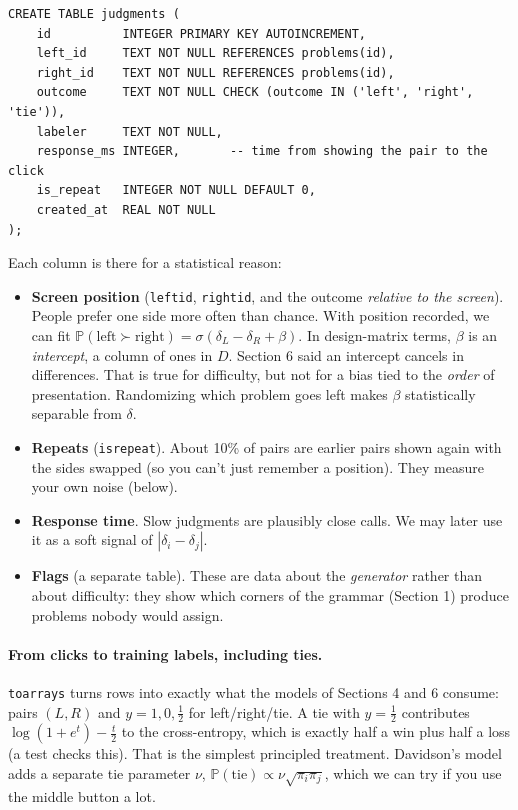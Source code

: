 \documentclass[11pt]{article}
\theoremstyle{definition}
\theoremstyle{plain}
\theoremstyle{remark}
\renewcommand{\P}{\mathbb{P}}
\newcommand{\code}[1]{\texttt{#1}}
\renewcommand{\_}{\oldunderscore\allowbreak}
\newcommand{\file}[1]{\textcolor{blue!50!black}{\texttt{#1}}}
\newcommand{\codefrom}[1]{\par\smallskip\noindent{\footnotesize\textbf{From} \file{#1}}}
\begin{document}
\codefrom{src/calcdiff/labels/store.py}
\begin{lstlisting}
CREATE TABLE judgments (
    id          INTEGER PRIMARY KEY AUTOINCREMENT,
    left_id     TEXT NOT NULL REFERENCES problems(id),
    right_id    TEXT NOT NULL REFERENCES problems(id),
    outcome     TEXT NOT NULL CHECK (outcome IN ('left', 'right', 'tie')),
    labeler     TEXT NOT NULL,
    response_ms INTEGER,       -- time from showing the pair to the click
    is_repeat   INTEGER NOT NULL DEFAULT 0,
    created_at  REAL NOT NULL
);
\end{lstlisting}
Each column is there for a statistical reason:
\begin{itemize}[nosep]
\item \textbf{Screen position} (\code{left\_id}, \code{right\_id}, and the outcome \emph{relative to the screen}). People prefer one side more
  often than chance. With position recorded, we can fit $\P(\text{left}\succ\text{right})=\sigma(\delta_L-\delta_R+\beta)$. In design-matrix terms,
  $\beta$ is an \emph{intercept}, a column of ones in $D$. Section 6 said an intercept cancels in differences. That is true for
  difficulty, but not for a bias tied to the \emph{order} of presentation. Randomizing which problem goes left makes $\beta$
  statistically separable from $\delta$.
\item \textbf{Repeats} (\code{is\_repeat}). About 10\% of pairs are earlier pairs shown again with the sides swapped (so you can't
  just remember a position). They measure your own noise (below).
\item \textbf{Response time}. Slow judgments are plausibly close calls. We may later use it as a soft signal of $|\delta_i-\delta_j|$.
\item \textbf{Flags} (a separate table). These are data about the \emph{generator} rather than about difficulty: they show which corners of the grammar
  (Section 1) produce problems nobody would assign.
\end{itemize}

\paragraph{From clicks to training labels, including ties.}
\code{to\_arrays} turns rows into exactly what the models of Sections 4 and 6 consume: pairs $(L,R)$ and $y=1,0,\frac12$ for
left/right/tie. A tie with $y=\frac12$ contributes $\log(1+e^{t})-\frac t2$ to the cross-entropy, which is exactly half a win plus half a loss
(a test checks this). That is the simplest principled treatment. Davidson's model adds a separate tie parameter $\nu$,
$\P(\text{tie})\propto\nu\sqrt{\pi_i\pi_j}$, which we can try if you use the middle button a lot.
\end{document}
